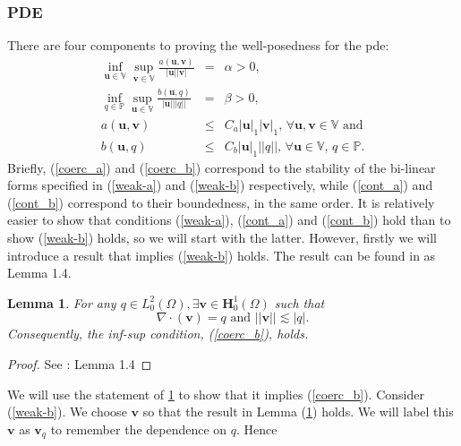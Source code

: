 \documentclass[12pt,a4paper]{article}
\newtheorem{lemma}[theorem]{Lemma}
\theoremstyle{definition}
\begin{document}
\subsubsection{PDE}
There are four components to proving the well-posedness for the pde:
	 \begin{eqnarray}\label{coerc_a}
	\inf_{\textbf{u}\in \mathbb{V}}\sup_{\textbf{v}\in \mathbb{V}}\frac{a\left(\textbf{u},\textbf{v}\right)}{\left|\textbf{u}\right| \left|\textbf{v}\right|}&=&\alpha>0,\\\label{coerc_b}
			\inf_{q\in \mathbb{P}}\sup_{\textbf{u}\in \mathbb{V}}\frac{b\left(\textbf{u},q\right)}{\left|\textbf{u}\right|  \left|\left|q\right|\right|}&=&\beta>0,\\\label{cont_a}
		a\left(\textbf{u},\textbf{v}\right)&\leq& C_a\left|\textbf{u}\right|_1\left|\textbf{v}\right|_1,\, \forall \textbf{u},\textbf{v} \in \mathbb{V}\text{ and}\\\label{cont_b}
		b\left(\textbf{u},q\right)&\leq& C_b\left|\textbf{u}\right|_1\left|\left|q\right|\right|,\,\forall \textbf{u} \in \mathbb{V},\, q \in \mathbb{P}.
	\end{eqnarray}
Briefly, (\ref{coerc_a}) and (\ref{coerc_b}) correspond to the stability of the bi-linear forms specified in (\ref{weak-a}) and (\ref{weak-b}) respectively, while (\ref{cont_a}) and (\ref{cont_b}) correspond to their boundedness, in the same order.  It is relatively easier to show that conditions (\ref{weak-a}), (\ref{cont_a}) and (\ref{cont_b}) hold than to show (\ref{weak-b}) holds, so we will start with the latter.  However, firstly we will introduce a result that implies (\ref{weak-b}) holds.  The result can be found in \cite{Chen2016} as Lemma 1.4.
\begin{lemma}\label{Lemma_equiv}
	For any $q\in L^2_0\left(\Omega\right), \exists \textbf{v}\in \textbf{H}^1_0\left(\Omega\right)$ such that
	\begin{equation}
		\nabla \cdot \left(\textbf{v}\right) = q \text{ and } \left|\left|\textbf{v}\right|\right| \lesssim  \left|q\right|.\nonumber 
	\end{equation}
	Consequently, the inf-sup condition, (\ref{coerc_b}), holds.
\end{lemma}
\begin{proof}
	See \cite{Chen2016}: Lemma 1.4
\end{proof}
We will use the statement of \ref{Lemma_equiv} to show that it implies (\ref{coerc_b}).  Consider (\ref{weak-b}).  We choose $\textbf{v}$ so that the result in Lemma (\ref{Lemma_equiv}) holds. We will label this $\textbf{v}$ as $\textbf{v}_q$ to remember the dependence on $q$.   Hence
\end{document}
